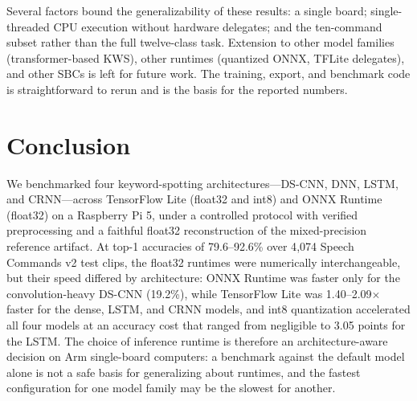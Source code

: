 \documentclass[conference,a4paper]{IEEEtran}
\begin{document}
Several factors bound the generalizability of these results: a single board; single-threaded CPU execution without hardware delegates; and the ten-command subset rather than the full twelve-class task. Extension to other model families (transformer-based KWS), other runtimes (quantized ONNX, TFLite delegates), and other SBCs is left for future work. The training, export, and benchmark code is straightforward to rerun and is the basis for the reported numbers.

\section{Conclusion}

We benchmarked four keyword-spotting architectures---DS-CNN, DNN, LSTM, and CRNN---across TensorFlow Lite (float32 and int8) and ONNX Runtime (float32) on a Raspberry Pi 5, under a controlled protocol with verified preprocessing and a faithful float32 reconstruction of the mixed-precision reference artifact. At top-1 accuracies of 79.6--92.6\% over 4{,}074 Speech Commands v2 test clips, the float32 runtimes were numerically interchangeable, but their speed differed by architecture: ONNX Runtime was faster only for the convolution-heavy DS-CNN (19.2\%), while TensorFlow Lite was 1.40--2.09$\times$ faster for the dense, LSTM, and CRNN models, and int8 quantization accelerated all four models at an accuracy cost that ranged from negligible to 3.05 points for the LSTM. The choice of inference runtime is therefore an architecture-aware decision on Arm single-board computers: a benchmark against the default model alone is not a safe basis for generalizing about runtimes, and the fastest configuration for one model family may be the slowest for another.



\end{document}

